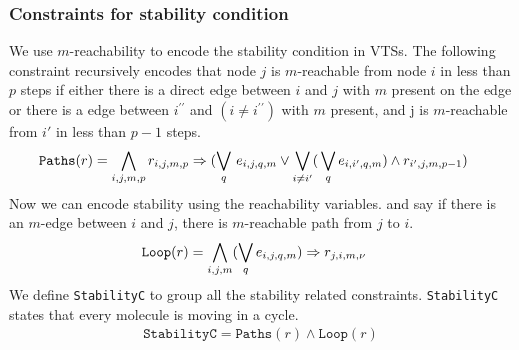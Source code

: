 \subsubsection{Constraints for stability condition}
%
We use $m$-reachability to encode the stability condition in VTSs.
%
The following constraint recursively encodes that node $j$ is $m$-reachable from node $i$ in less than $p$ steps
if either there is a direct edge between $i$ and $j$ with $m$ present on the edge or there is a edge between $i^{\prime \prime}$ and
$(i \neq i^{\prime \prime})$ with $m$ present, and j is $m$-reachable from $i'$ in less than $p-1$ steps.
%
\begin{align*}
  \texttt{Paths}(r) &= \bigwedge\limits_{i,j,m,p} r_{i,j,m,p} \Rightarrow (\bigvee_{q} \, e_{i,j,q,m} \lor \bigvee_{i\neq i^{\prime}} ( \, \bigvee_{q} e_{i,i^{\prime},q,m}) \land r_{i^{\prime},j,m,p-1} )
\end{align*}
Now we can encode stability using the reachability variables.
and say if there is an $m$-edge between $i$ and $j$, there is
$m$-reachable path from $j$ to $i$.
\begin{align*}
 \texttt{Loop}(r) &= \bigwedge\limits_{i,j,m} (\bigvee_{q} e_{i,j,q,m}) \Rightarrow r_{j,i,m,\nu}
\end{align*}
We define \texttt{StabilityC} to group all the stability related constraints.
% 
\texttt{StabilityC} states that every molecule is moving in a cycle.
\begin{align*}
\texttt{StabilityC} = \texttt{Paths}(r) \land \texttt{Loop}(r) 
\end{align*}







